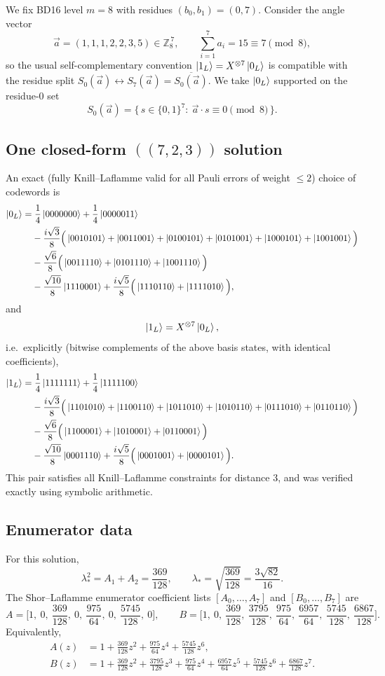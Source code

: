 \documentclass[11pt]{article}
\begin{document}
We fix BD16 level \(m=8\) with residues \((b_0,b_1)=(0,7)\).
Consider the angle vector
\[
\vec a=(1,1,1,2,2,3,5)\in\mathbb{Z}_8^{\,7},
\qquad
\sum_{i=1}^7 a_i = 15 \equiv 7 \pmod 8,
\]
so the usual self-complementary convention \(\ket{1_L}=X^{\otimes 7}\ket{0_L}\) is compatible with the residue split
\(S_0(\vec a)\leftrightarrow S_7(\vec a)=\overline{S_0(\vec a)}\).
We take \(\ket{0_L}\) supported on the residue-\(0\) set
\[
S_0(\vec a)=\{\,s\in\{0,1\}^7:\ \vec a\cdot s \equiv 0 \pmod 8\,\}.
\]

\subsection{One closed-form \texorpdfstring{\(((7,2,3))\)}{((7,2,3))} solution}
An exact (fully Knill--Laflamme valid for all Pauli errors of weight \(\le 2\)) choice of codewords is
\begin{align*}
\ket{0_L}
=&\;\frac14\ket{0000000}+\frac14\ket{0000011}\\
&-\frac{i\sqrt3}{8}\Big(
\ket{0010101}+\ket{0011001}+\ket{0100101}+\ket{0101001}+\ket{1000101}+\ket{1001001}
\Big)\\
&-\frac{\sqrt6}{8}\Big(
\ket{0011110}+\ket{0101110}+\ket{1001110}
\Big)\\
&-\frac{\sqrt{10}}{8}\ket{1110001}
+\frac{i\sqrt5}{8}\Big(\ket{1110110}+\ket{1111010}\Big),
\end{align*}
and
\[
\ket{1_L}=X^{\otimes 7}\ket{0_L},
\]
i.e.\ explicitly (bitwise complements of the above basis states, with identical coefficients),
\begin{align*}
\ket{1_L}
=&\;\frac14\ket{1111111}+\frac14\ket{1111100}\\
&-\frac{i\sqrt3}{8}\Big(
\ket{1101010}+\ket{1100110}+\ket{1011010}+\ket{1010110}+\ket{0111010}+\ket{0110110}
\Big)\\
&-\frac{\sqrt6}{8}\Big(
\ket{1100001}+\ket{1010001}+\ket{0110001}
\Big)\\
&-\frac{\sqrt{10}}{8}\ket{0001110}
+\frac{i\sqrt5}{8}\Big(\ket{0001001}+\ket{0000101}\Big).
\end{align*}
This pair satisfies all Knill--Laflamme constraints for distance \(3\), and was verified exactly using symbolic arithmetic.

\subsection{Enumerator data}
For this solution,
\[
\lambda_*^2=A_1+A_2=\frac{369}{128},
\qquad
\lambda_*=\sqrt{\frac{369}{128}}=\frac{3\sqrt{82}}{16}.
\]
The Shor--Laflamme enumerator coefficient lists \([A_0,\dots,A_7]\) and \([B_0,\dots,B_7]\) are
\[
A=\Big[1,\ 0,\ \frac{369}{128},\ 0,\ \frac{975}{64},\ 0,\ \frac{5745}{128},\ 0\Big],
\qquad
B=\Big[1,\ 0,\ \frac{369}{128},\ \frac{3795}{128},\ \frac{975}{64},\ \frac{6957}{64},\ \frac{5745}{128},\ \frac{6867}{128}\Big].
\]
Equivalently,
\begin{align*}
A(z)&=1+\frac{369}{128}z^2+\frac{975}{64}z^4+\frac{5745}{128}z^6,\\
B(z)&=1+\frac{369}{128}z^2+\frac{3795}{128}z^3+\frac{975}{64}z^4+\frac{6957}{64}z^5+\frac{5745}{128}z^6+\frac{6867}{128}z^7.
\end{align*}
\end{document}
